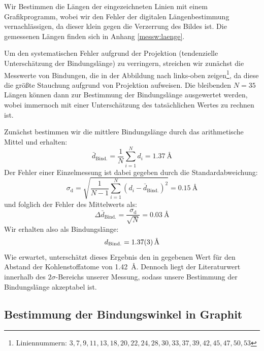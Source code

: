 \documentclass[10pt, a4paper]{article}
\begin{document}
Wir Bestimmen die Längen der eingezeichneten Linien mit einem Grafikprogramm, wobei wir den Fehler der digitalen Längenbestimmung vernachlässigen, da dieser klein gegen die Verzerrung des Bildes ist.
Die gemessenen Längen finden sich in Anhang \ref{messw:laenge}.

Um den systematischen Fehler aufgrund der Projektion (tendenzielle Unterschätzung der Bindungslänge) zu verringern, streichen wir zunächst die Messwerte von Bindungen, die in der Abbildung nach links-oben zeigen\footnote{Liniennummern: $3,7,9,11,13,18,20,22,24,28,30,33,37,39,42,45,47,50,53$}, da diese die größte Stauchung aufgrund von Projektion aufweisen.
Die bleibenden $N = \num{35}$ Längen können dann zur Bestimmung der Bindungslänge ausgewertet werden, wobei immernoch mit einer Unterschätzung des tatsächlichen Wertes zu rechnen ist.

Zunächst bestimmen wir die mittlere Bindungslänge durch das arithmetische Mittel und erhalten:
\begin{equation}
  \bar{d}_\mathrm{Bind.} = \frac{1}{N} \sum_{i=1}^N d_i= \SI{1,37}{\angstrom}
\end{equation}
Der Fehler einer Einzelmessung ist dabei gegeben durch die Standardabweichung:
\begin{equation}
  \sigma_\mathrm{d} = \sqrt{\frac{1}{N-1} \sum_{i=1}^N (d_i - \bar{d}_\mathrm{Bind.})^2} = \SI{0,15}{\angstrom}
\end{equation}
und folglich der Fehler des Mittelwerts als:
\begin{equation}
  \Delta \bar{d}_\mathrm{Bind.} = \frac{\sigma_\mathrm{d}}{\sqrt{N}} = \SI{0,03}{\angstrom}
\end{equation}
Wir erhalten also als Bindungslänge:
\begin{equation*}
  d_\mathrm{Bind.} = \SI{1,37 +- 0,03}{\angstrom}
\end{equation*}
Wie erwartet, unterschätzt dieses Ergebnis den in \cite{colton} gegebenen Wert für den Abstand der Kohlenstoffatome von \SI{1,42}{\angstrom}. Dennoch liegt der Literaturwert innerhalb des $2\sigma$-Bereichs unserer Messung, sodass unsere Bestimmung der Bindungslänge akzeptabel ist.

\subsection{Bestimmung der Bindungswinkel in Graphit}
\end{document}
